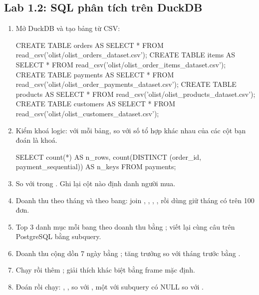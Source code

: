 
\subsection{Lab 1.2: SQL phân tích trên DuckDB}

\begin{enumerate}
  \item Mở DuckDB và tạo bảng từ CSV:
\begin{codeblock}
CREATE TABLE orders   AS SELECT * FROM read_csv('olist/olist_orders_dataset.csv');
CREATE TABLE items    AS SELECT * FROM read_csv('olist/olist_order_items_dataset.csv');
CREATE TABLE payments AS SELECT * FROM read_csv('olist/olist_order_payments_dataset.csv');
CREATE TABLE products AS SELECT * FROM read_csv('olist/olist_products_dataset.csv');
CREATE TABLE customers AS SELECT * FROM read_csv('olist/olist_customers_dataset.csv');
\end{codeblock}
  \item Kiểm khoá logic: với mỗi bảng, so  với số tổ hợp khác nhau của các cột bạn đoán là khoá.
\begin{codeblock}
SELECT count(*) AS n_rows,
       count(DISTINCT (order_id, payment_sequential)) AS n_keys
FROM payments;
\end{codeblock}
  \item So  với  trong . Ghi lại cột nào định danh người mua.
  \item Doanh thu theo tháng và theo bang: join , , , , rồi dùng  giữ tháng có trên 100 đơn.
  \item Top 3 danh mục mỗi bang theo doanh thu bằng ; viết lại cùng câu trên PostgreSQL bằng subquery.
  \item Doanh thu cộng dồn 7 ngày bằng ; tăng trưởng so với tháng trước bằng .
  \item Chạy  rồi thêm ; giải thích khác biệt bằng frame mặc định.
  \item Đoán rồi chạy: , ,  so với , một  với subquery có NULL so với .
\end{enumerate}


